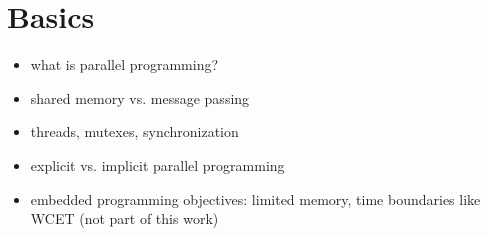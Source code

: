 \chapter{Basics}
\begin{itemize}
\item what is parallel programming?
\item shared memory vs. message passing
\item threads, mutexes, synchronization
\item explicit vs. implicit parallel programming
\item embedded programming objectives: limited memory, time boundaries like WCET (not part of this work)
\end{itemize}